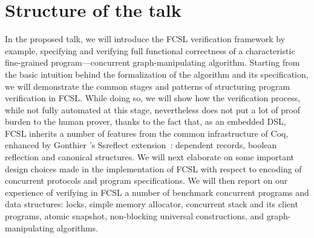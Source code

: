 \documentclass[blockstyle,preprint,nocopyrightspace]{sigplanconf}
\begin{document}
\section*{Structure of the talk}
\label{sec:structure-talk}

In the proposed talk, we will introduce the FCSL verification
framework by example, specifying and verifying full functional
correctness of a characteristic fine-grained program---concurrent
graph-manipulating algorithm.
%
Starting from the basic intuition behind the formalization of the
algorithm and its specification, we will demonstrate the common stages
and patterns of structuring program verification in FCSL.
%
While doing so, we will show how the verification process, while not
fully automated at this stage, nevertheless does not put a lot of
proof burden to the human prover, thanks to the fact that, as an
embedded DSL, FCSL inherits a number of features from the common
infrastructure of Coq, enhanced by Gonthier \etal's Ssreflect
extension~\cite{Gonthier-al:TR}: dependent records, boolean reflection
and canonical structures.
%
We will next elaborate on some important design choices made in the
implementation of FCSL with respect to encoding of concurrent
protocols and program specifications.
%
We will then report on our experience of verifying in FCSL a number of
benchmark concurrent programs and data structures: locks, simple
memory allocator, concurrent stack and its client programs, atomic
snapshot, non-blocking universal constructions, and graph-manipulating
algorithms.



 
\end{document}
